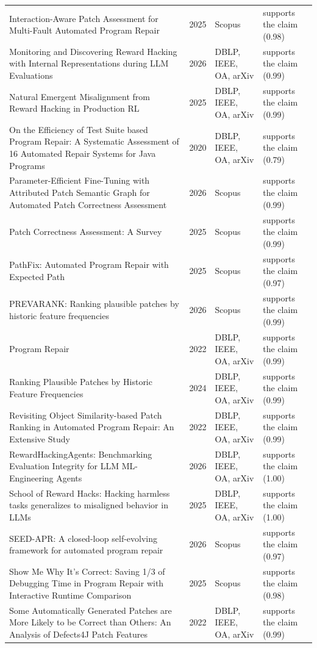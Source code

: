 \begin{longtable}{@{}%
  >{\raggedright\arraybackslash}p{}c%
  >{\raggedright\arraybackslash}p{}%
  >{\raggedright\arraybackslash}p{}@{}}
Interaction-Aware Patch Assessment for Multi-Fault Automated Program Repair & 2025 & Scopus & supports the claim (0.98) \\
Monitoring and Discovering Reward Hacking with Internal Representations during LLM Evaluations & 2026 & DBLP, IEEE, OA, arXiv & supports the claim (0.99) \\
Natural Emergent Misalignment from Reward Hacking in Production RL & 2025 & DBLP, IEEE, OA, arXiv & supports the claim (0.99) \\
On the Efficiency of Test Suite based Program Repair: A Systematic Assessment of 16 Automated Repair Systems for Java Programs & 2020 & DBLP, IEEE, OA, arXiv & supports the claim (0.79) \\
Parameter-Efficient Fine-Tuning with Attributed Patch Semantic Graph for Automated Patch Correctness Assessment & 2026 & Scopus & supports the claim (0.99) \\
Patch Correctness Assessment: A Survey & 2025 & Scopus & supports the claim (0.99) \\
PathFix: Automated Program Repair with Expected Path & 2025 & Scopus & supports the claim (0.97) \\
PREVARANK: Ranking plausible patches by historic feature frequencies & 2026 & Scopus & supports the claim (0.99) \\
Program Repair & 2022 & DBLP, IEEE, OA, arXiv & supports the claim (0.99) \\
Ranking Plausible Patches by Historic Feature Frequencies & 2024 & DBLP, IEEE, OA, arXiv & supports the claim (0.99) \\
Revisiting Object Similarity-based Patch Ranking in Automated Program Repair: An Extensive Study & 2022 & DBLP, IEEE, OA, arXiv & supports the claim (0.99) \\
RewardHackingAgents: Benchmarking Evaluation Integrity for LLM ML-Engineering Agents & 2026 & DBLP, IEEE, OA, arXiv & supports the claim (1.00) \\
School of Reward Hacks: Hacking harmless tasks generalizes to misaligned behavior in LLMs & 2025 & DBLP, IEEE, OA, arXiv & supports the claim (1.00) \\
SEED-APR: A closed-loop self-evolving framework for automated program repair & 2026 & Scopus & supports the claim (0.97) \\
Show Me Why It's Correct: Saving 1/3 of Debugging Time in Program Repair with Interactive Runtime Comparison & 2025 & Scopus & supports the claim (0.98) \\
Some Automatically Generated Patches are More Likely to be Correct than Others: An Analysis of Defects4J Patch Features & 2022 & DBLP, IEEE, OA, arXiv & supports the claim (0.99) \\

\end{longtable}
